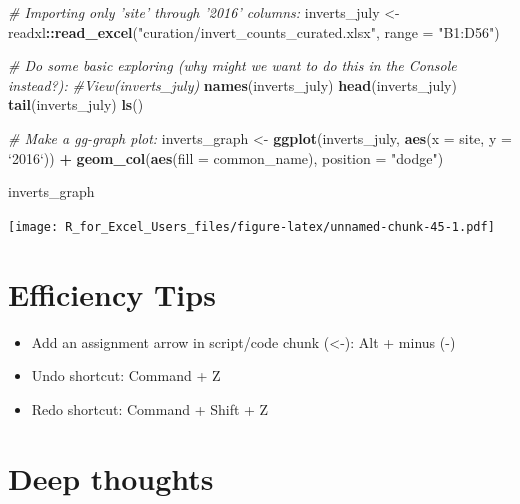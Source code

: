 \documentclass[]{book}
\newenvironment{Shaded}{\begin{snugshade}}{\end{snugshade}}
\newcommand{\CommentTok}[1]{\textcolor[rgb]{0.56,0.35,0.01}{\textit{#1}}}
\newcommand{\DataTypeTok}[1]{\textcolor[rgb]{0.13,0.29,0.53}{#1}}
\newcommand{\KeywordTok}[1]{\textcolor[rgb]{0.13,0.29,0.53}{\textbf{#1}}}
\newcommand{\NormalTok}[1]{#1}
\newcommand{\OperatorTok}[1]{\textcolor[rgb]{0.81,0.36,0.00}{\textbf{#1}}}
\newcommand{\StringTok}[1]{\textcolor[rgb]{0.31,0.60,0.02}{#1}}
\providecommand{\tightlist}{%
  \setlength{\itemsep}{0pt}\setlength{\parskip}{0pt}}
\begin{document}
\begin{Shaded}
\begin{Highlighting}[]
\CommentTok{# Importing only 'site' through '2016' columns: }
\NormalTok{inverts_july <-}\StringTok{ }\NormalTok{readxl}\OperatorTok{::}\KeywordTok{read_excel}\NormalTok{(}\StringTok{"curation/invert_counts_curated.xlsx"}\NormalTok{, }\DataTypeTok{range =} \StringTok{"B1:D56"}\NormalTok{)}

\CommentTok{# Do some basic exploring (why might we want to do this in the Console instead?):}
\CommentTok{#View(inverts_july)}
\KeywordTok{names}\NormalTok{(inverts_july)}
\KeywordTok{head}\NormalTok{(inverts_july)}
\KeywordTok{tail}\NormalTok{(inverts_july)}
\KeywordTok{ls}\NormalTok{()}

\CommentTok{# Make a gg-graph plot: }
\NormalTok{inverts_graph <-}\StringTok{ }\KeywordTok{ggplot}\NormalTok{(inverts_july, }\KeywordTok{aes}\NormalTok{(}\DataTypeTok{x =}\NormalTok{ site, }\DataTypeTok{y =} \StringTok{`}\DataTypeTok{2016}\StringTok{`}\NormalTok{)) }\OperatorTok{+}
\StringTok{  }\KeywordTok{geom_col}\NormalTok{(}\KeywordTok{aes}\NormalTok{(}\DataTypeTok{fill =}\NormalTok{ common_name), }
           \DataTypeTok{position =} \StringTok{"dodge"}\NormalTok{)}
\end{Highlighting}
\end{Shaded}

\begin{Shaded}
\begin{Highlighting}[]
\NormalTok{inverts_graph}
\end{Highlighting}
\end{Shaded}

\texttt{[image: R\_for\_Excel\_Users\_files/figure-latex/unnamed-chunk-45-1.pdf]}

\hypertarget{efficiency-tips-1}{%
\section{Efficiency Tips}\label{efficiency-tips-1}}

\begin{itemize}
\tightlist
\item
  Add an assignment arrow in script/code chunk (\textless{}-): Alt + minus (-)
\item
  Undo shortcut: Command + Z
\item
  Redo shortcut: Command + Shift + Z
\end{itemize}

\hypertarget{deep-thoughts}{%
\section{Deep thoughts}\label{deep-thoughts}}
\end{document}
